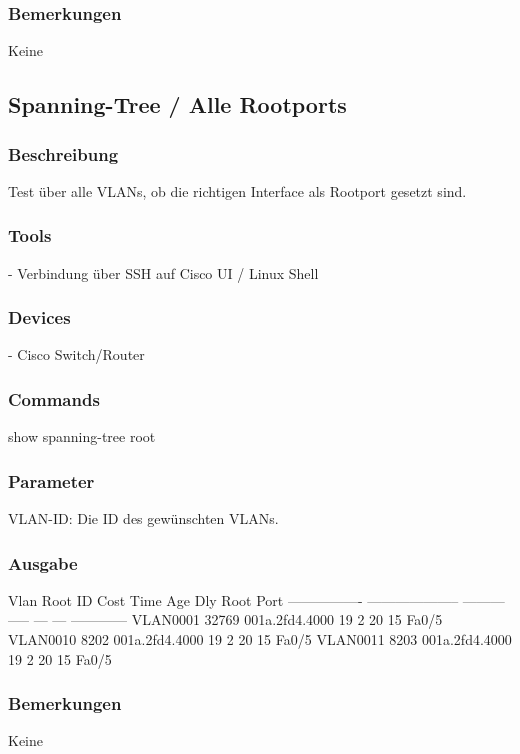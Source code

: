 \documentclass[a4,12pt]{scrartcl}
\begin{document}
\subsubsection{Bemerkungen}
Keine


\subsection{Spanning-Tree / Alle Rootports}
\subsubsection{Beschreibung}
Test über alle VLANs, ob die richtigen Interface als Rootport gesetzt sind.
\subsubsection{Tools}
- Verbindung über SSH auf Cisco UI / Linux Shell
\subsubsection{Devices}
- Cisco Switch/Router
\subsubsection{Commands}
show spanning-tree root
\subsubsection{Parameter}
VLAN-ID: Die ID des gewünschten VLANs.
\subsubsection{Ausgabe}
Vlan                   Root ID          Cost    Time  Age Dly  Root Port\newline
---------------- -------------------- --------- ----- --- ---  ------------\newline
VLAN0001         32769 001a.2fd4.4000        19    2   20  15  Fa0/5\newline
VLAN0010          8202 001a.2fd4.4000        19    2   20  15  Fa0/5\newline
VLAN0011          8203 001a.2fd4.4000        19    2   20  15  Fa0/5\newline
\subsubsection{Bemerkungen}
Keine
\end{document}

